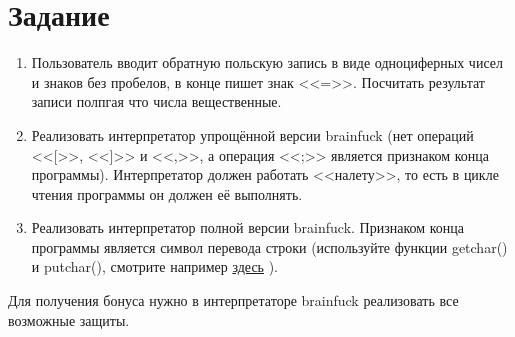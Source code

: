 \documentclass[12pt]{article}
\begin{document}
\section{Задание}

\begin{enumerate}
 \item Пользователь вводит обратную польскую запись в виде одноциферных чисел и знаков без пробелов, в конце пишет знак <<=>>. Посчитать результат записи полпгая что числа вещественные.
 \item Реализовать интерпретатор упрощённой версии brainfuck (нет операций <<[>>, <<]>> и <<,>>, а операция <<;>> является признаком конца программы). Интерпретатор должен работать <<налету>>, то есть в цикле чтения программы он должен её выполнять.
 \item Реализовать интерпретатор полной версии brainfuck. Признаком конца программы является символ перевода строки (используйте функции getchar() и putchar(), смотрите например \href{http://www.cplusplus.com/reference/cstdio/}{здесь} ).
\end{enumerate}

Для получения бонуса нужно в интерпретаторе brainfuck реализовать все возможные защиты.
\end{document}
